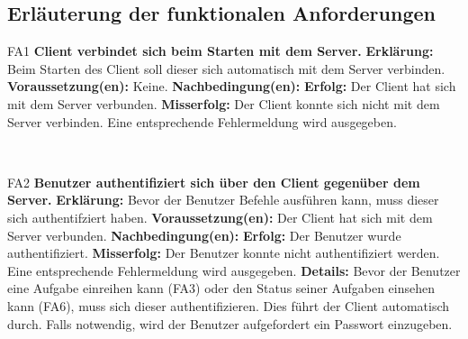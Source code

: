 \documentclass[a4paper,12pt]{article}
\begin{document}
\subsection{Erläuterung der funktionalen Anforderungen}

\begin{itemize}[nosep]
	\leftskip=0.5cm
	\begin{minipage}[t]{\linewidth}
		\item[FA1] \textbf{\gls{Client} verbindet sich beim Starten mit dem Server.}
		\subitem \textbf{Erklärung:} Beim Starten des \gls{Client} soll dieser sich automatisch mit dem \gls{Server} verbinden.
		\subitem \textbf{Voraussetzung(en):} Keine.
		\subitem \textbf{Nachbedingung(en):}
		\subsubitem \textbf{Erfolg:} Der \gls{Client} hat sich mit dem \gls{Server} verbunden.
		\subsubitem \textbf{Misserfolg:} Der \gls{Client} konnte sich nicht mit dem \gls{Server} verbinden. Eine entsprechende Fehlermeldung wird ausgegeben.
	\end{minipage}
	\newline
	\\
	
	\begin{minipage}[t]{\linewidth}
		\item[FA2] \textbf{Benutzer authentifiziert sich über den \gls{Client} gegenüber dem Server.}
		\subitem \textbf{Erklärung:} Bevor der Benutzer Befehle ausführen kann, muss dieser sich authentifziert haben.
		\subitem \textbf{Voraussetzung(en):} Der Client hat sich mit dem Server verbunden.
		\subitem \textbf{Nachbedingung(en):} 
		\subsubitem \textbf{Erfolg:} Der \gls{Benutzer} wurde authentifiziert.
		\subsubitem \textbf{Misserfolg:} Der \gls{Benutzer} konnte nicht authentifiziert werden. Eine entsprechende Fehlermeldung wird ausgegeben.
		\subitem \textbf{Details:} Bevor der Benutzer eine Aufgabe einreihen kann (FA3) oder den Status seiner Aufgaben einsehen kann (FA6), muss sich dieser authentifizieren. Dies führt der Client automatisch durch. Falls notwendig, wird der \gls{Benutzer} aufgefordert ein Passwort einzugeben.
	\end{minipage}
    \newline
    \\
    

\end{itemize}
\end{document}
